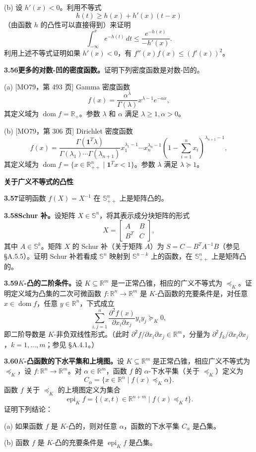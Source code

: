 \documentclass[UTF8,12pt,a4paper,fontset=fandol]{ctexart}
\DeclareMathOperator{\dom}{dom}
\DeclareMathOperator{\epi}{epi}
\begin{document}
(b) 设 $h'(x)<0$。利用不等式
\[
h(t)\geq h(x)+h'(x)(t-x)
\]
（由函数 $h$ 的凸性可以直接得到）来证明
\[
\int_{-\infty}^x e^{-h(t)}\,dt\leq \frac{e^{-h(x)}}{-h'(x)}.
\]
利用上述不等式证明如果 $h'(x)<0$，有 $f''(x)f(x)\leq(f'(x))^2$。

\noindent\textbf{3.56\quad 更多的对数-凹的密度函数。}\quad 证明下列密度函数是对数-凹的。

(a) [MO79，第 493 页] Gamma 密度函数
\[
f(x)=\frac{\alpha^\lambda}{\Gamma(\lambda)}x^{\lambda-1}e^{-\alpha x},
\]
其定义域为 $\dom f=\mathbb{R}_+$。参数 $\lambda$ 和 $\alpha$ 满足 $\lambda\geq1,\alpha>0$。

(b) [MO79，第 306 页] Dirichlet 密度函数
\[
f(x)=\frac{\Gamma(\mathbf{1}^T\lambda)}{\Gamma(\lambda_1)\cdots\Gamma(\lambda_{n+1})}x_1^{\lambda_1-1}\cdots x_n^{\lambda_n-1}\left(1-\sum_{i=1}^n x_i\right)^{\lambda_{n+1}-1},
\]
其定义域为 $\dom f=\{x\in\mathbb{R}_{++}^n\mid \mathbf{1}^Tx<1\}$。参数 $\lambda$ 满足 $\lambda\succeq1$。

\noindent\textbf{关于广义不等式的凸性}

\noindent\textbf{3.57}\quad 证明函数 $f(X)=X^{-1}$ 在 $\mathbb{S}_{++}^n$ 上是矩阵凸的。

\noindent\textbf{3.58\quad Schur 补。}\quad 设矩阵 $X\in\mathbb{S}^n$，将其表示成分块矩阵的形式
\[
X=
\begin{bmatrix}
A & B\\
B^T & C
\end{bmatrix},
\]
其中 $A\in\mathbb{S}^k$。矩阵 $X$ 的 Schur 补（关于矩阵 $A$）为 $S=C-B^TA^{-1}B$（参见 \S A.5.5）。证明 Schur 补若看成 $\mathbb{S}^n$ 映射到 $\mathbb{S}^{n-k}$ 上的函数，在 $\mathbb{S}_{++}^n$ 上是矩阵凸的。

\noindent\textbf{3.59\quad $K$-凸的二阶条件。}\quad 设 $K\subseteq\mathbb{R}^m$ 是一正常凸锥，相应的广义不等式为 $\preceq_K$。证明定义域为凸集的二次可微函数 $f:\mathbb{R}^n\to\mathbb{R}^m$ 是 $K$-凸函数的充要条件是，对任意 $x\in\dom f$，任意 $y\in\mathbb{R}^n$，下式成立
\[
\sum_{i,j=1}^n \frac{\partial^2 f(x)}{\partial x_i\partial x_j}y_iy_j\succeq_K0,
\]
即二阶导数是 $K$-非负双线性形式。（此时 $\partial^2 f/\partial x_i\partial x_j\in\mathbb{R}^m$，分量为 $\partial^2 f_k/\partial x_i\partial x_j$，$k=1,\ldots,m$；参见 \S A.4.1。）

\noindent\textbf{3.60\quad $K$-凸函数的下水平集和上境图。}\quad 设 $K\subseteq\mathbb{R}^m$ 是正常凸锥，相应广义不等式为 $\preceq_K$，设 $f:\mathbb{R}^n\to\mathbb{R}^m$。对 $\alpha\in\mathbb{R}^m$，函数 $f$ 的 $\alpha$-下水平集（关于 $\preceq_K$）定义为
\[
C_\alpha=\{x\in\mathbb{R}^n\mid f(x)\preceq_K\alpha\}.
\]
函数 $f$ 关于 $\preceq_K$ 的上境图定义为集合
\[
\epi_K f=\{(x,t)\in\mathbb{R}^{n+m}\mid f(x)\preceq_K t\}.
\]
证明下列结论：

(a) 如果函数 $f$ 是 $K$-凸的，则对任意 $\alpha$，函数的下水平集 $C_\alpha$ 是凸集。

(b) 函数 $f$ 是 $K$-凸的充要条件是 $\epi_K f$ 是凸集。
\end{document}
